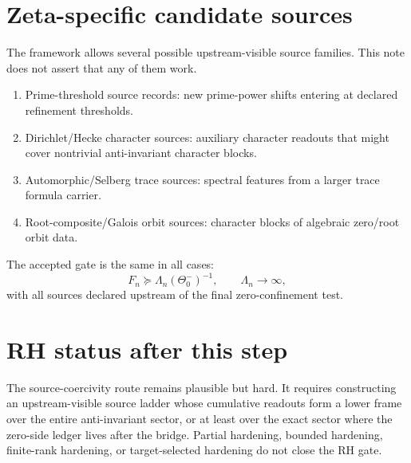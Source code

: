 \documentclass[11pt]{article}
\begin{document}
\section{Zeta-specific candidate sources}
The framework allows several possible upstream-visible source families.  This note does not assert that any of them work.
\begin{enumerate}[leftmargin=*]
\item Prime-threshold source records: new prime-power shifts entering at declared refinement thresholds.
\item Dirichlet/Hecke character sources: auxiliary character readouts that might cover nontrivial anti-invariant character blocks.
\item Automorphic/Selberg trace sources: spectral features from a larger trace formula carrier.
\item Root-composite/Galois orbit sources: character blocks of algebraic zero/root orbit data.
\end{enumerate}
The accepted gate is the same in all cases:
\[
F_n\succeq\Lambda_n(\Theta_0^-)^{-1},\qquad \Lambda_n\to\infty,
\]
with all sources declared upstream of the final zero-confinement test.

\section{RH status after this step}
The source-coercivity route remains plausible but hard.  It requires constructing an upstream-visible source ladder whose cumulative readouts form a lower frame over the entire anti-invariant sector, or at least over the exact sector where the zero-side ledger lives after the bridge.  Partial hardening, bounded hardening, finite-rank hardening, or target-selected hardening do not close the RH gate.
\end{document}

